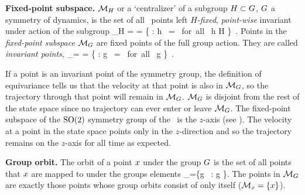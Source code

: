 {%
\begin{definition}
\label{def:centralizer}
\textbf{Fixed-point subspace.}
${\cal M}_H$ or a `centralizer' of a subgroup $H \subset G$,
$G$ a symmetry of dynamics, is the set of all \statesp\
points left \emph{$H$-fixed}, \emph{point-wise} invariant
under action of the subgroup
\beq
\pS_H =  =
   \{ \ssp \in \pS : {h} \, \ssp = \ssp \mbox{ for all } h \in H \}
\,.
Points in the \emph{fixed-point subspace}  $\pS_\Group$ are fixed
points of the full group action. They are called \emph{invariant
points},
\beq
\pS_\Group = \Fix{\Group} =
   \{ \ssp \in \pS : {g} \, \ssp = \ssp \mbox{ for all } g \in \Group \}
\,.
\end{definition}

If a point is an invariant point of the symmetry group, the definition of equivariance  tells us that the velocity at that point is also in $\pS_\Group$, so the trajectory through that point will remain in $\pS_\Group$. $\pS_\Group$ is disjoint from the rest of the state space since no trajectory can ever enter or leave $\pS_\Group$. The fixed-point subspace of the $\SOn{2}$ symmetry group of the \cLe\ is the $z$-axis (see ). The velocity at a point in the state space points only in the $z$-direction and so the trajectory remains on the $z$-axis for all time as expected.

\begin{definition}
\label{def:grouporbit}
\textbf{Group orbit.}
The orbit of a point $\ssp$ under the group $\Group$ is the set of all points that $\ssp$ are mapped to under the groups elements
\beq
\pS_\ssp=\{{g} \, \ssp: g \in \Group\}.
\eeq
The points in ${\cal M}_{G}$ are exactly those points whose group orbits consist of only itself (${\cal M}_{x}=\{x\}$).
\end{definition}

}
